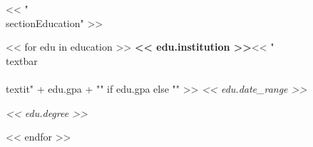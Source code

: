 << "\\section{Education}" >>

<< for edu in education >>
    \hspace{0.5em} \textbf{<< edu.institution >>}<< " \\textbar\\ \\textit{" + edu.gpa + "}" if edu.gpa else "" >> \hfill \textit{<< edu.date_range >>}

    \hspace{0.5em} \textit{<< edu.degree >>}

    \vspace{0.10 cm}
<< endfor >>
